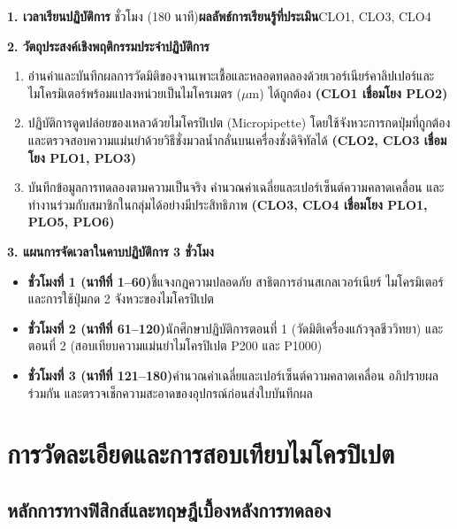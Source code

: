 \cleardoublepage
{}
\begin{planbox}
\noindent\textbf{1. เวลาเรียนปฏิบัติการ} ชั่วโมง (180 นาที)\quad \textbf{ผลลัพธ์การเรียนรู้ที่ประเมิน}\quad CLO1, CLO3, CLO4

\noindent\textbf{2. วัตถุประสงค์เชิงพฤติกรรมประจำปฏิบัติการ}
\begin{enumerate}
    \item อ่านค่าและบันทึกผลการวัดมิติของจานเพาะเชื้อและหลอดทดลองด้วยเวอร์เนียร์คาลิปเปอร์และไมโครมิเตอร์พร้อมแปลงหน่วยเป็นไมโครเมตร ($\mu\text{m}$) ได้ถูกต้อง \textbf{(CLO1 เชื่อมโยง PLO2)}
    \item ปฏิบัติการดูดปล่อยของเหลวด้วยไมโครปิเปต (Micropipette) โดยใช้จังหวะการกดปุ่มที่ถูกต้อง และตรวจสอบความแม่นยำด้วยวิธีชั่งมวลน้ำกลั่นบนเครื่องชั่งดิจิทัลได้ \textbf{(CLO2, CLO3 เชื่อมโยง PLO1, PLO3)}
    \item บันทึกข้อมูลการทดลองตามความเป็นจริง คำนวณค่าเฉลี่ยและเปอร์เซ็นต์ความคลาดเคลื่อน และทำงานร่วมกับสมาชิกในกลุ่มได้อย่างมีประสิทธิภาพ \textbf{(CLO3, CLO4 เชื่อมโยง PLO1, PLO5, PLO6)}
\end{enumerate}

\noindent\textbf{3. แผนการจัดเวลาในคาบปฏิบัติการ 3 ชั่วโมง}
\begin{itemize}
    \item \textbf{ชั่วโมงที่ 1 (นาทีที่ 1--60)}\quad ชี้แจงกฎความปลอดภัย สาธิตการอ่านสเกลเวอร์เนียร์ ไมโครมิเตอร์ และการใช้ปุ่มกด 2 จังหวะของไมโครปิเปต
    \item \textbf{ชั่วโมงที่ 2 (นาทีที่ 61--120)}\quad นักศึกษาปฏิบัติการตอนที่ 1 (วัดมิติเครื่องแก้วจุลชีววิทยา) และตอนที่ 2 (สอบเทียบความแม่นยำไมโครปิเปต P200 และ P1000)
    \item \textbf{ชั่วโมงที่ 3 (นาทีที่ 121--180)}\quad คำนวณค่าเฉลี่ยและเปอร์เซ็นต์ความคลาดเคลื่อน อภิปรายผลร่วมกัน และตรวจเช็กความสะอาดของอุปกรณ์ก่อนส่งใบบันทึกผล
\end{itemize}
\end{planbox}
\clearpage

\chapter{การวัดละเอียดและการสอบเทียบไมโครปิเปต}

\section{หลักการทางฟิสิกส์และทฤษฎีเบื้องหลังการทดลอง}

